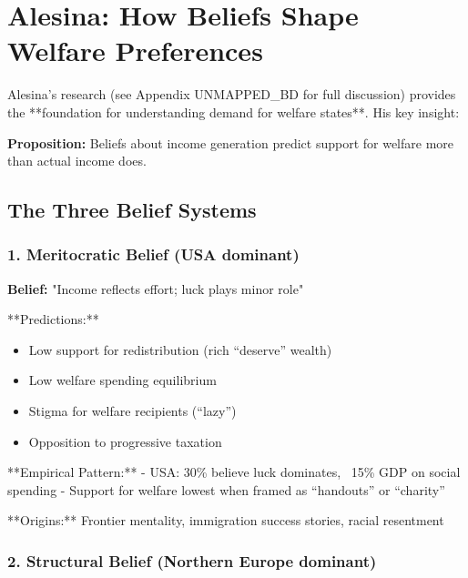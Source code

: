 
\section{Alesina: How Beliefs Shape Welfare Preferences}
\label{sec:alesina-welfare}

Alesina's research (see Appendix UNMAPPED_BD for full discussion) provides the **foundation for understanding demand for welfare states**. His key insight:

\textbf{Proposition:} Beliefs about income generation predict support for welfare more than actual income does.

\subsection{The Three Belief Systems}

\subsubsection{1. Meritocratic Belief (USA dominant)}

\textbf{Belief:} "Income reflects effort; luck plays minor role"

**Predictions:**
\begin{itemize}
\item Low support for redistribution (rich ``deserve'' wealth)
\item Low welfare spending equilibrium
\item Stigma for welfare recipients (``lazy'')
\item Opposition to progressive taxation
\end{itemize}

**Empirical Pattern:**
- USA: 30\% believe luck dominates, ~15\% GDP on social spending
- Support for welfare lowest when framed as ``handouts'' or ``charity''

**Origins:** Frontier mentality, immigration success stories, racial resentment

\subsubsection{2. Structural Belief (Northern Europe dominant)}

